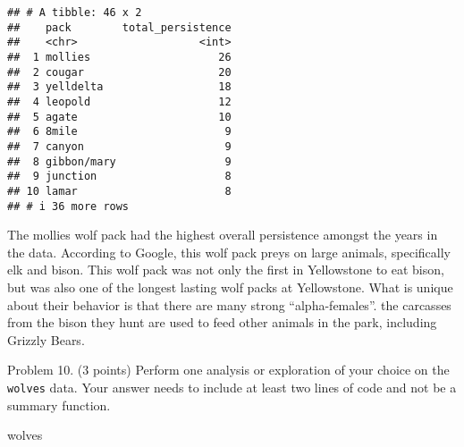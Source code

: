 \documentclass[
]{article}
\newenvironment{Shaded}{\begin{snugshade}}{\end{snugshade}}
\newcommand{\NormalTok}[1]{#1}
\begin{document}
\begin{verbatim}
## # A tibble: 46 x 2
##    pack        total_persistence
##    <chr>                   <int>
##  1 mollies                    26
##  2 cougar                     20
##  3 yelldelta                  18
##  4 leopold                    12
##  5 agate                      10
##  6 8mile                       9
##  7 canyon                      9
##  8 gibbon/mary                 9
##  9 junction                    8
## 10 lamar                       8
## # i 36 more rows
\end{verbatim}

The mollies wolf pack had the highest overall persistence amongst the
years in the data. According to Google, this wolf pack preys on large
animals, specifically elk and bison. This wolf pack was not only the
first in Yellowstone to eat bison, but was also one of the longest
lasting wolf packs at Yellowstone. What is unique about their behavior
is that there are many strong ``alpha-females''. the carcasses from the
bison they hunt are used to feed other animals in the park, including
Grizzly Bears.

Problem 10. (3 points) Perform one analysis or exploration of your
choice on the \texttt{wolves} data. Your answer needs to include at
least two lines of code and not be a summary function.

\begin{Shaded}
\begin{Highlighting}[]
\NormalTok{wolves}
\end{Highlighting}
\end{Shaded}
\end{document}
